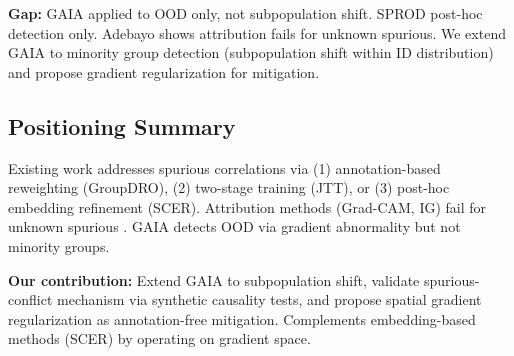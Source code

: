 \textbf{Gap:} GAIA applied to OOD only, not subpopulation shift. SPROD post-hoc detection only. Adebayo shows attribution fails for unknown spurious. We extend GAIA to minority group detection (subpopulation shift within ID distribution) and propose gradient regularization for mitigation.

\subsection{Positioning Summary}

Existing work addresses spurious correlations via (1) annotation-based reweighting (GroupDRO), (2) two-stage training (JTT), or (3) post-hoc embedding refinement (SCER). Attribution methods (Grad-CAM, IG) fail for unknown spurious \cite{adebayo2022post}. GAIA detects OOD via gradient abnormality but not minority groups.

\textbf{Our contribution:} Extend GAIA to subpopulation shift, validate spurious-conflict mechanism via synthetic causality tests, and propose spatial gradient regularization as annotation-free mitigation. Complements embedding-based methods (SCER) by operating on gradient space.
